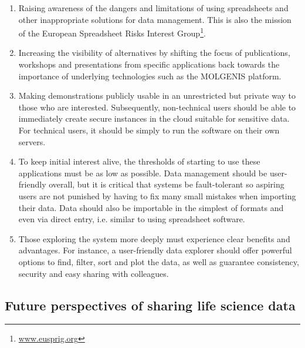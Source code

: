 \begin{tcolorbox}[width=\textwidth,colframe=deeporange,colback={white},title={Box 3: Actions towards uptake of better data management tools},colbacktitle=white,coltitle=black,enhanced]
\begin{enumerate}
  \item Raising awareness of the dangers and limitations of using spreadsheets and other inappropriate solutions for data management. This is also the mission of the European Spreadsheet Risks Interest Group\footnote{\url{www.eusprig.org}}.
  \item Increasing the visibility of alternatives by shifting the focus of publications, workshops and presentations from specific applications back towards the importance of underlying technologies such as the MOLGENIS platform.
  \item Making demonstrations publicly usable in an unrestricted but private way to those who are interested. Subsequently, non-technical users should be able to immediately create secure instances in the cloud suitable for sensitive data. For technical users, it should be simply to run the software on their own servers.
  \item To keep initial interest alive, the thresholds of starting to use these applications must be as low as possible. Data management should be user-friendly overall, but it is critical that systems be fault-tolerant so aspiring users are not punished by having to fix many small mistakes when importing their data. Data should also be importable in the simplest of formats and even via direct entry, i.e. similar to using spreadsheet software.
  \item Those exploring the system more deeply must experience clear benefits and advantages. For instance, a user-friendly data explorer should offer powerful options to find, filter, sort and plot the data, as well as guarantee consistency, security and easy sharing with colleagues.
\end{enumerate}
\end{tcolorbox}

\subsection{Future perspectives of sharing life science data} \label{modelsection_future}

